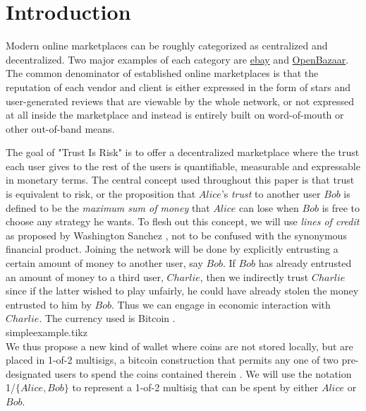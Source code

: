 \section{Introduction}
  Modern online marketplaces can be roughly categorized as centralized and decentralized.
  Two major examples of each category are \href{http://www.ebay.com}{ebay} and \href{https://openbazaar.org/}{OpenBazaar}.
  The common denominator of established online marketplaces is that the reputation of each vendor and client is either
  expressed in the form of stars and user-generated reviews that are viewable by the whole network, or not expressed at
  all inside the marketplace and instead is entirely built on word-of-mouth or other out-of-band means.

  The goal of "Trust Is Risk" is to offer a decentralized marketplace where the trust each user gives to the rest of the users
  is quantifiable, measurable and expressable in monetary terms. The central concept used throughout this paper is that trust
  is equivalent to risk, or the proposition that $Alice$'s \textit{trust} to another user $Bob$ is defined to be the
  \textit{maximum sum of money} that $Alice$ can lose when $Bob$ is free to choose any strategy he wants. To flesh out this
  concept, we will use \textit{lines of credit} as proposed by Washington Sanchez \cite{loc}, not to be confused with the
  synonymous financial product. Joining the network will be done by explicitly entrusting a certain amount of money to another
  user, say $Bob$. If $Bob$ has already entrusted an amount of money to a third user, $Charlie$, then we indirectly trust
  $Charlie$ since if the latter wished to play unfairly, he could have already stolen the money entrusted to him by $Bob$.
  Thus we can engage in economic interaction with $Charlie$. The currency used is Bitcoin \cite{bitcoin}.
  \medskip \ \\
  {simpleexample.tikz} \smallskip \ \\
  We thus propose a new kind of wallet where coins are not stored locally, but are placed in 1-of-2 multisigs, a bitcoin
  construction that permits any one of two pre-designated users to spend the coins contained therein \cite{masteringbitcoin}.
  We will use the notation 1/$\{Alice, Bob\}$ to represent a 1-of-2 multisig that can be spent by either $Alice$ or $Bob$.

